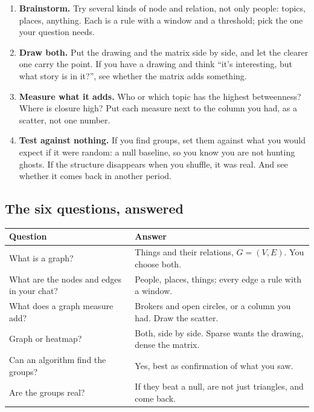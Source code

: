 \documentclass[12pt, a4paper]{article}
\theoremstyle{definition}
\theoremstyle{remark}
\begin{document}
\begin{enumerate}
\item \textbf{Brainstorm.} Try several kinds of node and relation, not only people: topics, places, anything. Each is a rule with a window and a threshold; pick the one your question needs.
\item \textbf{Draw both.} Put the drawing and the matrix side by side, and let the clearer one carry the point. If you have a drawing and think ``it's interesting, but what story is in it?'', see whether the matrix adds something.
\item \textbf{Measure what it adds.} Who or which topic has the highest betweenness? Where is closure high? Put each measure next to the column you had, as a scatter, not one number.
\item \textbf{Test against nothing.} If you find groups, set them against what you would expect if it were random: a null baseline, so you know you are not hunting ghosts. If the structure disappears when you shuffle, it was real. And see whether it comes back in another period.
\end{enumerate}

\subsection{The six questions, answered}
\label{sec:lesson7-summary}
\begin{table}[H]
\centering
\begin{tabularx}{\textwidth}{@{}l X@{}}
\toprule
\textbf{Question} & \textbf{Answer} \\
\midrule
What is a graph? & Things and their relations, $G = (V, E)$. You choose both. \\
What are the nodes and edges in your chat? & People, places, things; every edge a rule with a window. \\
What does a graph measure add? & Brokers and open circles, or a column you had. Draw the scatter. \\
Graph or heatmap? & Both, side by side. Sparse wants the drawing, dense the matrix. \\
Can an algorithm find the groups? & Yes, best as confirmation of what you saw. \\
Are the groups real? & If they beat a null, are not just triangles, and come back. \\
\bottomrule
\end{tabularx}
\end{table}
\end{document}
